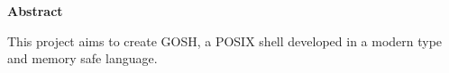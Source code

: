 \thispagestyle{empty}

\begin{center}
    {\LARGE\bf Abstract}
\end{center}
This project aims to create GOSH, a POSIX shell developed in a modern type and memory safe language. 
